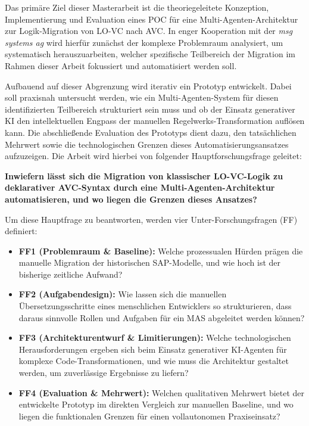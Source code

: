 Das primäre Ziel dieser Masterarbeit ist die theoriegeleitete Konzeption, Implementierung und Evaluation eines \ac{POC} für eine Multi-Agenten-Architektur zur Logik-Migration von \ac{LO-VC} nach \ac{AVC}. In enger Kooperation mit der \textit{msg systems ag} wird hierfür zunächst der komplexe Problemraum analysiert, um systematisch herauszuarbeiten, welcher spezifische Teilbereich der Migration im Rahmen dieser Arbeit fokussiert und automatisiert werden soll.

Aufbauend auf dieser Abgrenzung wird iterativ ein Prototyp entwickelt. Dabei soll praxisnah untersucht werden, wie ein Multi-Agenten-System für diesen identifizierten Teilbereich strukturiert sein muss und ob der Einsatz generativer \ac{KI} den intellektuellen Engpass der manuellen Regelwerks-Transformation auflösen kann. Die abschließende Evaluation des Prototyps dient dazu, den tatsächlichen Mehrwert sowie die technologischen Grenzen dieses Automatisierungsansatzes aufzuzeigen. Die Arbeit wird hierbei von folgender Hauptforschungsfrage geleitet: 
\begin{forschungsfrage}
\textbf{Inwiefern lässt sich die Migration von klassischer LO-VC-Logik zu deklarativer AVC-Syntax durch eine Multi-Agenten-Architektur automatisieren, und wo liegen die Grenzen dieses Ansatzes?} 
\end{forschungsfrage}
Um diese Hauptfrage zu beantworten, werden vier Unter-Forschungsfragen (FF) definiert:
\begin{itemize}
    \item \textbf{FF1 (Problemraum \& Baseline):} Welche prozessualen Hürden prägen die manuelle Migration der historischen SAP-Modelle, und wie hoch ist der bisherige zeitliche Aufwand?
    \item \textbf{FF2 (Aufgabendesign):} Wie lassen sich die manuellen Übersetzungsschritte eines menschlichen Entwicklers so strukturieren, dass daraus sinnvolle Rollen und Aufgaben für ein \ac{MAS} abgeleitet werden können?
    \item \textbf{FF3 (Architekturentwurf \& Limitierungen):} Welche technologischen Herausforderungen ergeben sich beim Einsatz generativer KI-Agenten für komplexe Code-Transformationen, und wie muss die Architektur gestaltet werden, um zuverlässige Ergebnisse zu liefern?
    \item \textbf{FF4 (Evaluation \& Mehrwert):} Welchen qualitativen Mehrwert bietet der entwickelte Prototyp im direkten Vergleich zur manuellen Baseline, und wo liegen die funktionalen Grenzen für einen vollautonomen Praxiseinsatz?
\end{itemize}

